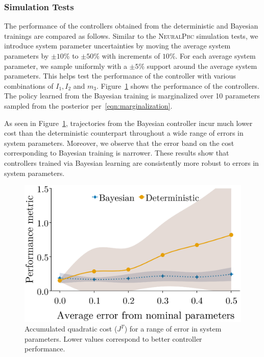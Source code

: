 \subsubsection{Simulation Tests} 
The performance of the controllers obtained from the deterministic and Bayesian
trainings are compared as follows.
%
%
Similar to the \textsc{NeuralPbc} simulation tests, we introduce system
parameter uncertainties by moving the average system parameters by $\pm
10\%$ to $\pm 50\%$ with increments of $10\%$. 
%
For each average system parameter, we sample uniformly with a $\pm 5\%$ support
around the average system parameters. 
%
This helps test the performance of the controller with various combinations of
$I_1, I_2$ and $m_3$.
%
%
%
Figure~\ref{fig:comparison_idapbc} shows the performance of the controllers.
The policy learned from the Bayesian training is marginalized over 10
parameters sampled from the posterior per~\eqref{eqn:marginalization}.

As seen in Figure~\ref{fig:comparison_idapbc}, trajectories from the Bayesian
controller incur much lower cost than the deterministic counterpart throughout a
wide range of errors in system parameters.
%
Moreover, we observe that the error band on the cost corresponding to Bayesian
training is narrower.
%
These results show that controllers trained via Bayesian learning are
consistently more robust to errors in system parameters.
\begin{figure}
    \centering
    \includegraphics[clip,width=0.6\columnwidth]{./figures/bandplot1.eps}%
    \caption{
        Accumulated quadratic cost ($J^T$) for a range of error in system
        parameters. 
        Lower values correspond to better controller performance.
    }
    \label{fig:comparison_idapbc}
\end{figure}

